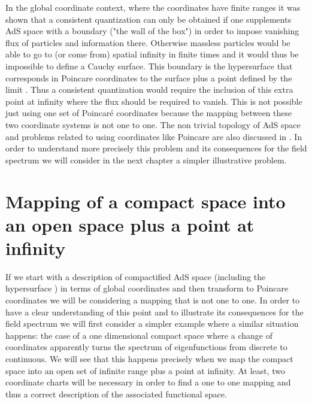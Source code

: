 \documentclass[a4paper,12pt]{article}
\begin{document}
\bigskip

In the global coordinate context, where the coordinates have  
finite ranges it was shown that a consistent quantization 
can only be obtained if  one  supplements AdS space 
with a boundary ("the wall of the box") in order to impose vanishing
flux of particles and  information there\cite{QAdS1,QAdS2}.
Otherwise massless particles would be able to go to (or come from)  
spatial infinity in finite times and it would thus be impossible 
to define a Cauchy surface. 
This boundary is the hypersurface \coordHE{} 
that corresponds in Poincare coordinates  to the surface \coordHE{} 
plus a point defined by the limit \coordHE{}.
Thus a consistent quantization would require the inclusion of
this extra point at infinity where the flux should be required to vanish.
This is not possible just using one set of Poincar\'e coordinates
because the mapping between these two coordinate systems is not one to one.
The non trivial  topology of AdS space and problems related to using 
coordinates like Poincare are also discussed in \cite{McI}.
In order to understand more precisely this 
problem  and its consequences for the field spectrum we will 
consider in the next chapter a simpler illustrative problem.
 

\section{Mapping of a compact space into an open space plus 
a point at infinity}
\label{mapping}

If we start with a description of compactified AdS space 
(including the hypersurface \coordHE{}) 
in terms of global coordinates and then transform
to Poincare coordinates we will be  considering  a mapping that is not 
one to one. 
In order to have a clear understanding of this point and to 
illustrate its consequences for the field spectrum we will 
first consider a simpler example where
a similar  situation happens: the case of a 
one dimensional compact space where  a change of coordinates
apparently turns the spectrum of eigenfunctions from 
discrete to continuous.
We will see that this happens precisely when we map 
the compact space into an open set of infinite range plus  a  point 
at infinity. At least, two coordinate charts will be necessary in order 
to find a one to one mapping and thus a correct description of the 
associated functional space.
\end{document}
